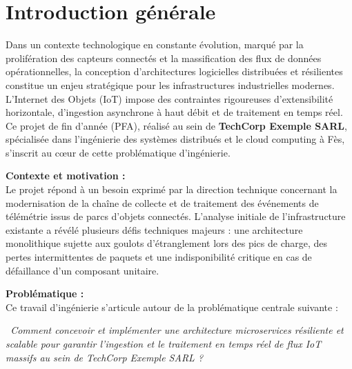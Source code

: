 \chapter*{Introduction g\'en\'erale}

\noindent
Dans un contexte technologique en constante \'evolution, marqu\'e par la prolif\'eration des capteurs connect\'es et la massification des flux de donn\'ees op\'erationnelles, la conception d'architectures logicielles distribu\'ees et r\'esilientes constitue un enjeu strat\'egique pour les infrastructures industrielles modernes. L'Internet des Objets (IoT) impose des contraintes rigoureuses d'extensibilit\'e horizontale, d'ingestion asynchrone \`a haut d\'ebit et de traitement en temps r\'eel. Ce projet de fin d'ann\'ee (PFA), r\'ealis\'e au sein de \textbf{TechCorp Exemple SARL}, sp\'ecialis\'ee dans l'ing\'enierie des syst\`emes distribu\'es et le cloud computing \`a F\`es, s'inscrit au c\oe ur de cette probl\'ematique d'ing\'enierie.

\vspace{0.4cm}

\noindent
\textbf{Contexte et motivation :}\\
Le projet r\'epond \`a un besoin exprim\'e par la direction technique concernant la modernisation de la cha\^ine de collecte et de traitement des \'ev\'enements de t\'el\'em\'etrie issus de parcs d'objets connect\'es. L'analyse initiale de l'infrastructure existante a r\'ev\'el\'e plusieurs d\'efis techniques majeurs : une architecture monolithique sujette aux goulots d'\'etranglement lors des pics de charge, des pertes intermittentes de paquets et une indisponibilit\'e critique en cas de d\'efaillance d'un composant unitaire.

\vspace{0.4cm}

\noindent
\textbf{Probl\'ematique :}\\
Ce travail d'ing\'enierie s'articule autour de la probl\'ematique centrale suivante :
\begin{center}
    \textit{\guillemotleft~Comment concevoir et impl\'ementer une architecture microservices r\'esiliente et scalable pour garantir l'ingestion et le traitement en temps r\'eel de flux IoT massifs au sein de TechCorp Exemple SARL ?~\guillemotright}
\end{center}

\vspace{0.4cm}

